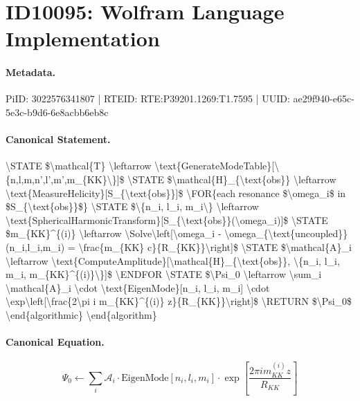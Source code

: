 \section*{ID10095: Wolfram Language Implementation}
\paragraph{Metadata.}
PiID: 3022576341807 | RTEID: RTE:P39201.1269:T1.7595 | UUID: ae29f940-e65c-5e3c-b9d6-6e8acbb6eb8c

\paragraph{Canonical Statement.}
\textbackslash{}STATE \$\textbackslash{}mathcal\{T\} \textbackslash{}leftarrow \textbackslash{}text\{GenerateModeTable\}[\textbackslash{}\{n,l,m,n',l',m',m\_\{KK\}\textbackslash{}\}]\$ \textbackslash{}STATE \$\textbackslash{}mathcal\{H\}\_\{\textbackslash{}text\{obs\}\} \textbackslash{}leftarrow \textbackslash{}text\{MeasureHelicity\}[S\_\{\textbackslash{}text\{obs\}\}]\$ \textbackslash{}FOR\{each resonance \$\textbackslash{}omega\_i\$ in \$S\_\{\textbackslash{}text\{obs\}\}\$\} \textbackslash{}STATE \$\textbackslash{}\{n\_i, l\_i, m\_i\textbackslash{}\} \textbackslash{}leftarrow \textbackslash{}text\{SphericalHarmonicTransform\}[S\_\{\textbackslash{}text\{obs\}\}(\textbackslash{}omega\_i)]\$ \textbackslash{}STATE \$m\_\{KK\}\textasciicircum{}\{(i)\} \textbackslash{}leftarrow \textbackslash{}Solve\textbackslash{}left[\textbackslash{}omega\_i - \textbackslash{}omega\_\{\textbackslash{}text\{uncoupled\}\}(n\_i,l\_i,m\_i) = \textbackslash{}frac\{m\_\{KK\} c\}\{R\_\{KK\}\}\textbackslash{}right]\$ \textbackslash{}STATE \$\textbackslash{}mathcal\{A\}\_i \textbackslash{}leftarrow \textbackslash{}text\{ComputeAmplitude\}[\textbackslash{}mathcal\{H\}\_\{\textbackslash{}text\{obs\}\}, \textbackslash{}\{n\_i, l\_i, m\_i, m\_\{KK\}\textasciicircum{}\{(i)\}\textbackslash{}\}]\$ \textbackslash{}ENDFOR \textbackslash{}STATE \$\textbackslash{}Psi\_0 \textbackslash{}leftarrow \textbackslash{}sum\_i \textbackslash{}mathcal\{A\}\_i \textbackslash{}cdot \textbackslash{}text\{EigenMode\}[n\_i, l\_i, m\_i] \textbackslash{}cdot \textbackslash{}exp\textbackslash{}left[\textbackslash{}frac\{2\textbackslash{}pi i m\_\{KK\}\textasciicircum{}\{(i)\} z\}\{R\_\{KK\}\}\textbackslash{}right]\$ \textbackslash{}RETURN \$\textbackslash{}Psi\_0\$ \textbackslash{}end\{algorithmic\} \textbackslash{}end\{algorithm\}

\paragraph{Canonical Equation.}
\[
\Psi_0 \leftarrow \sum_i \mathcal{A}_i \cdot \text{EigenMode}[n_i, l_i, m_i] \cdot \exp\left[\frac{2\pi i m_{KK}^{(i)} z}{R_{KK}}\right]
\]

